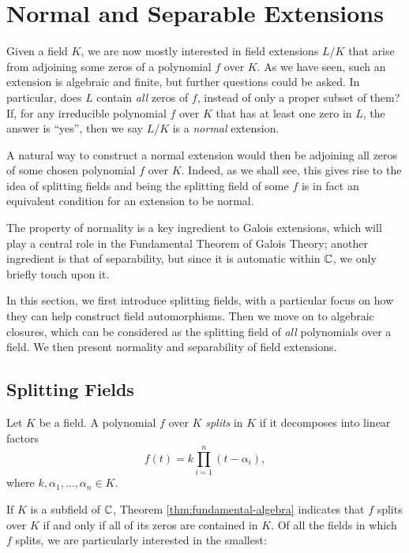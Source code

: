 \section{Normal and Separable Extensions}

Given a field $K$, we are now mostly interested in field extensions $L/K$ that arise from adjoining some zeros of a polynomial $f$ over $K$. As we have seen, such an extension is algebraic and finite, but further questions could be asked. In particular, does $L$ contain \textit{all} zeros of $f$, instead of only a proper subset of them? If,  for any irreducible polynomial $f$ over $K$ that has at least one zero in $L$, the answer is ``yes'', then we say $L/K$ is a \textit{normal} extension. 

A natural way to construct a normal extension would then be adjoining all zeros of some chosen polynomial $f$ over $K$. Indeed, as we shall see, this gives rise to the idea of splitting fields and being the splitting field of some $f$ is in fact an equivalent condition for an extension to be normal. 

The property of normality is a key ingredient to Galois extensions, which will play a central role in the Fundamental Theorem of Galois Theory; another ingredient is that of separability, but since it is automatic within $\mathbb C$, we only briefly touch upon it. 

In this section, we first introduce splitting fields, with a particular focus on how they can help construct field automorphisms. Then we move on to algebraic closures, which can be considered as the splitting field of \textit{all} polynomials over a field. We then present normality and separability of field extensions. 




\subsection{Splitting Fields}
\begin{definition}
    Let $K$ be a field. A polynomial $f$ over $K$ \textit{splits} in $K$ if it decomposes into linear factors $$
    f(t) = k \prod _{i=1} ^n (t - \alpha_i),
    $$
    where $k, \alpha_1, \ldots, \alpha_n \in K$. 
\end{definition}
If $K$ is a subfield of $\mathbb C$, Theorem \ref{thm:fundamental-algebra} indicates that $f$ splits over $K$ if and only if all of its zeros are contained in $K$. 
Of all the fields in which $f$ splits, we are particularly interested in the smallest:

